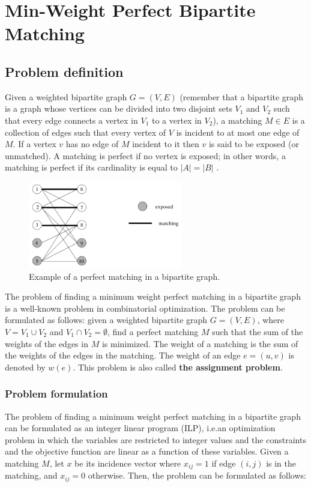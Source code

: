 \chapter{Min-Weight Perfect Bipartite Matching}

\section{Problem definition}
Given a weighted bipartite graph $G = (V, E)$ (remember that a bipartite graph is a graph whose vertices can be divided into two disjoint sets $V_1$ and $V_2$ such that every edge connects a vertex in $V_1$ to a vertex in $V_2$), a matching $M \in E$ is a collection of edges such that every vertex of $V$ is incident to at most one edge of $M$. If a vertex $v$ has no edge of $M$ incident to it then $v$ is said to be exposed (or unmatched). A matching is perfect if no vertex is exposed; in other words, a matching is perfect if its cardinality is equal to $|A| = |B|$ \cite{goemans2009matching}.

\begin{figure}[H]
    \centering
    \includegraphics[width=0.6\textwidth]{Immagini/matching_example.png}
    \caption{Example of a perfect matching in a bipartite graph.}
    \label{fig:matching_example}
\end{figure}

The problem of finding a minimum weight perfect matching in a bipartite graph is a well-known problem in combinatorial optimization. The problem can be formulated as follows: given a weighted bipartite graph $G = (V, E)$, where $V = V_1 \cup V_2$ and $V_1 \cap V_2 = \emptyset$, find a perfect matching $M$ such that the sum of the weights of the edges in $M$ is minimized. The weight of a matching is the sum of the weights of the edges in the matching. The weight of an edge $e = (u, v)$ is denoted by $w(e)$. This problem is also called \textbf{the assignment problem}.

\subsection{Problem formulation}
The problem of finding a minimum weight perfect matching in a bipartite graph can be formulated as an integer linear program (ILP), i.e.an optimization problem in which the variables are restricted to integer values and the constraints and the objective function are linear as a function of these variables. Given a matching $M$, let $x$ be its incidence vector where $x_{ij} = 1$ if edge $(i, j)$ is in the matching, and $x_{ij} = 0$ otherwise. Then, the problem can be formulated as follows:

